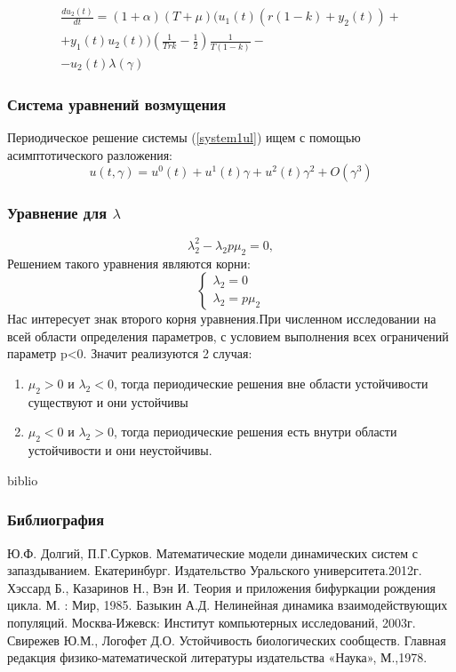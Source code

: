 \documentclass[12pt]{beamer}
\begin{document}
  \begin{multline*}
     \frac{d u_2(t)}{d t}=(1+\alpha) (T+\mu)(u_1(t)( r(1-k) + y_2(t))+\\+y_1(t)u_2(t) )\left( \frac{1}{T r k} - \frac{1}{2}\right)\frac{1}{T(1-k)}-\\-u_2 (t) \lambda (\gamma)
  \end{multline*}
\begin{frame}
\frametitle{Система уравнений возмущения}
  Периодическое решение системы (\ref{system1ul}) ищем с помощью асимптотического разложения:
\begin{equation*}
    u(t, \gamma)= u^0 (t) + u^1 (t)\gamma + u^2(t) \gamma^2 + O(\gamma^3)
\end{equation*}  
\end{frame}
\begin{frame}
\frametitle{Уравнение для $\lambda$}
  \begin{equation}
    \lambda_2 ^2  -\lambda_2 p \mu_2 =0,
\end{equation}
Решением такого уравнения являются корни:
\begin{equation}
    \begin{cases}
    \lambda_2 =0 \\
    \lambda_2 = p \mu_2
    \end{cases}
\end{equation}
Нас интересует знак второго корня уравнения.При численном исследовании на всей области определения параметров, с условием выполнения всех ограничений параметр p<0. Значит реализуются 2 случая:
\begin{enumerate}
 \item $ \mu_2 >0 $ и $\lambda_2 <0$, тогда периодические решения вне области устойчивости существуют и они устойчивы\\
 \item $ \mu_2 < 0 $ и $\lambda_2 >0$, тогда периодические решения есть внутри области устойчивости и они неустойчивы.\\
 \end{enumerate}
\end{frame}

\begin{frame}{biblio}
    \frametitle{Библиография}
    \begin{thebibliography}{5}
    Ю.Ф. Долгий, П.Г.Сурков. Математические модели динамических систем с запаздыванием. Екатеринбург. Издательство Уральского университета.2012г.
    Хэссард Б., Казаринов Н., Вэн И. Теория и приложения бифуркации рождения цикла. М. : Мир, 1985.
    Базыкин А.Д. Нелинейная динамика взаимодействующих популяций. Москва-Ижевск: Институт компьютерных исследований, 2003г.
    Свирежев Ю.М., Логофет Д.О. Устойчивость биологических сообществ. Главная редакция физико-математической литературы издательства «Наука», М.,1978.
    \end{thebibliography}
      \end{frame}
\end{document}
